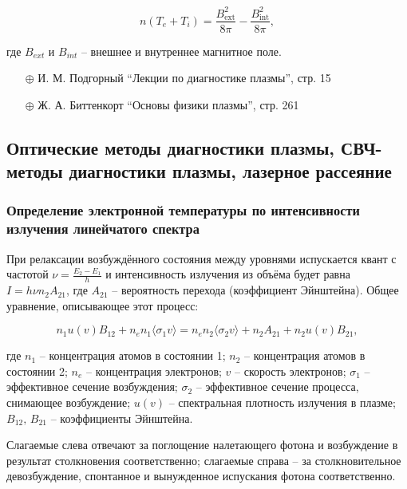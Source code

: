 \documentclass[10pt, a4paper]{article}
\begin{document}
\begin{equation*}
	n(T_e + T_i)= \frac{B_{\text{ext}}^2}{8 \pi} - \frac{B_{\text{int}}^2}{8 \pi},
\end{equation*}

где $B_{ext}$ и $B_{int}$ -- внешнее и внутреннее магнитное поле.
 
\begin{itemize}
	\item[$\oplus$] И. М. Подгорный ``Лекции по диагностике плазмы'', стр. 15
	\item[$\oplus$] Ж. А. Биттенкорт ``Основы физики плазмы'', стр. 261
\end{itemize}

\subsection{Оптические методы диагностики плазмы, СВЧ-методы диагностики плазмы, лазерное рассеяние} \label{subsec:optical_diagnostics}

\subsubsection{Определение электронной температуры по интенсивности излучения линейчатого спектра}

При релаксации возбуждённого состояния между уровнями испускается квант с частотой $\nu=\frac{E_2-E_1}{h}$ и интенсивность излучения из объёма будет равна $I=h\nu n_2 A_{21}$, где $A_{21}$ -- вероятность перехода (коэффициент Эйнштейна). Общее уравнение, описывающее этот процесс:

\begin{equation} \label{eq:radiation}
	n_1 u(v)B_{12}+n_e n_1 \langle\sigma_1 v\rangle = n_e n_2 \langle\sigma_2 v\rangle + n_2 A_{21}+n_2 u(v) B_{21},
\end{equation}

где $n_1$ -- концентрация атомов в состоянии 1; $n_2$ -- концентрация атомов в состоянии 2; $n_e$ -- концентрация электронов; $v$ -- скорость электронов; $\sigma_1$ -- эффективное сечение возбуждения; $\sigma_2$ -- эффективное сечение процесса, снимающее возбуждение; $u(v)$ -- спектральная плотность излучения в плазме; $B_{12},\,B_{21}$ -- коэффициенты Эйнштейна.

Слагаемые слева отвечают за поглощение налетающего фотона и возбуждение в результат столкновения соответственно; слагаемые справа -- за столкновительное девозбуждение, спонтанное и вынужденное испускания фотона соответственно.
\end{document}
